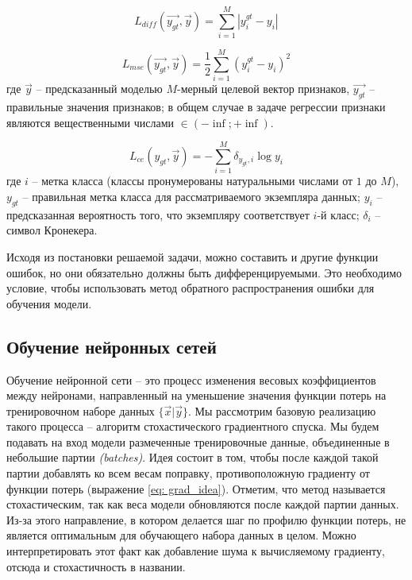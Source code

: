 \begin{equation}\label{eq:diff}
    L_{diff}(\vec{y_{gt}}, \vec{y}) = \sum_{i=1}^M | y^{gt}_{i} - y_{i} |
\end{equation}

\begin{equation}\label{eq: se}
    L_{mse}(\vec{y_{gt}}, \vec{y}) = \frac{1}{2} \sum_{i=1}^M (y^{gt}_{i} - y_{i})^2
\end{equation}
где $\vec{y}$ -- предсказанный моделью $M$-мерный целевой вектор 
признаков, $\vec{y_{gt}}$ -- правильные значения признаков; в общем
случае в задаче регрессии признаки являются вещественными числами
 $\in (- \inf; + \inf )$.

\begin{equation}\label{eq: cross_entropy}
    L_{ce}(y_{gt}, \vec{y}) = - \sum_{i=1}^M \delta_{y_{gt}, i} \log{y_{i}}
\end{equation}
где $i$ -- метка класса (классы пронумерованы натуральными 
числами от $1$ до $M$),
$y_{gt}$ --  правильная метка класса
для рассматриваемого экземпляра данных;
$y_i$ -- предсказанная вероятность того, что 
экземпляру соответствует $i$-й класс;
$\delta_i$ -- символ Кронекера. 


\indent
\indent
Исходя из постановки решаемой задачи, можно составить и другие функции ошибок, но
они обязательно должны быть дифференцируемыми.
Это необходимо условие, чтобы использовать метод обратного распространения
ошибки для обучения модели.


\subsection{Обучение нейронных сетей}

\indent
\indent
Обучение нейронной сети -- это процесс изменения весовых
коэффициентов между нейронами, направленный на уменьшение
 значения функции потерь на тренировочном наборе данных $\{ \vec{x} | \vec{y} \}$. 
 Мы рассмотрим базовую реализацию такого процесса -- алгоритм 
 стохастического градиентного спуска. Мы будем подавать на вход модели
 размеченные тренировочные данные, объединенные в  небольшие партии 
 \textit{(batches)}. Идея состоит в том, чтобы после каждой такой партии
добавлять ко всем весам поправку, противоположную градиенту от функции потерь
(выражение \ref{eq: grad_idea}). 
Отметим, что метод называется стохастическим, так как веса 
модели обновляются после каждой партии данных. Из-за этого
направление, в котором делается шаг по профилю функции потерь,
не является оптимальным для обучающего набора данных в целом.
Можно интерпретировать этот факт как добавление шума
к вычисляемому градиенту, отсюда и стохастичность в названии.



